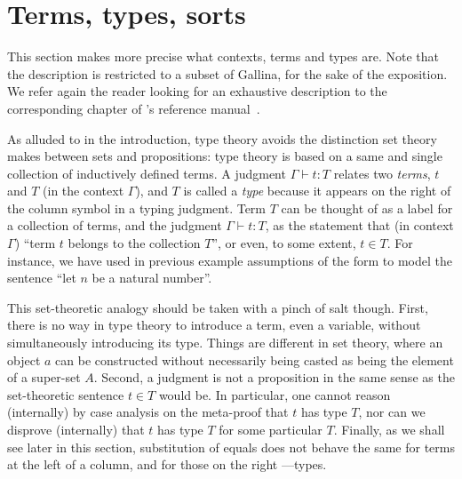 


\section{Terms, types, sorts}\label{sec:terms}

This section makes more precise what contexts, terms and types
are. Note that the description is restricted to a subset of Gallina,
for the sake of the exposition. We refer again the reader looking for
an exhaustive description to the corresponding chapter of \Coq{}'s
reference manual~\cite{Coq:manual}.

As alluded to in the introduction, type theory avoids the distinction
set theory makes between sets and propositions: type theory is based
on a same and single collection of inductively defined terms. A
judgment $\Gamma \vdash t : T$ relates two \emph{terms}, $t$ and $T$ (in the
context $\Gamma$), and $T$ is called a \emph{type} because it appears
on the right of the column symbol in a typing judgment. Term $T$ can be
thought of as a label for a collection of terms, and the judgment
$\Gamma \vdash t : T$, as the statement that (in context $\Gamma$)
``term $t$ belongs to the collection $T$'', or even, to some extent,
$t\in T$. 
For instance, we have used in previous example assumptions of the
form  to model the sentence ``let $n$ be a natural number''.

This set-theoretic analogy should be taken with a pinch of salt
though. First, there is no way in type theory to introduce a term, even
a variable, without simultaneously introducing its type. Things are
different in set theory, where an object $a$ can be constructed without
necessarily being casted as being the element of a super-set
$A$. Second, a judgment is not a proposition in the same sense as the
set-theoretic sentence $t \in T$ would be. In particular, one cannot
reason (internally) by case analysis on the meta-proof that
$t$ has type $T$, nor can we disprove (internally) that $t$ has type $T$ for some particular
$T$. Finally, as we shall see later in this section, substitution of
equals does not behave the same for terms at the left of a column, and
for those on the right ---types.


